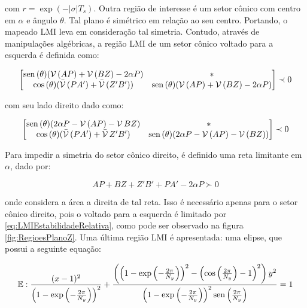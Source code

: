 \noindent com $r = \exp{\left(-|\sigma|T_s\right)}$. Outra região de interesse é um setor cônico com centro em $\alpha$ e ângulo $\theta$. Tal plano é simétrico em relação ao seu centro. Portando, o mapeado LMI leva em consideração tal simetria. Contudo, através de manipulações algébricas, a região LMI de um setor cônico voltado para a esquerda é definida como:

\begin{equation}
  \begin{bmatrix*}[c]
    \sen{(\theta)(\Herm{(AP)} + \Herm{(BZ)} -2\alpha P)} &  * \\
    \cos{(\theta)(\herm{(PA')} + \herm{(Z'B')})}      &  \sen{(\theta)(\Herm{(AP)} + \Herm{(BZ)} -2\alpha P)}
  \end{bmatrix*}
  \prec 0\label{eq:LMIESetorConicoEsquerdo}
\end{equation}

\noindent com seu lado direito dado como:

\begin{equation}
  \begin{bmatrix*}[c]
    \sen{(\theta)(2\alpha P - \Herm{(AP)} - \Herm{BZ})} & * \\
    \cos{(\theta)(\herm{(PA')} + \herm{Z'B'})}       & \sen{(\theta)(2\alpha P - \Herm{(AP)} - \Herm{(BZ)})}
  \end{bmatrix*}
  \prec 0\label{eq:LMIESetorConicoDireito}
\end{equation}

Para impedir a simetria do setor cônico direito, é definido uma reta limitante em $\alpha$, dado por:

\begin{equation}
  AP + BZ + Z'B' + PA' -2\alpha P\label{eq:LMIRightBounded} \succ 0
\end{equation}

\noindent onde considera a área a direita de tal reta. Isso é necessário apenas para o setor cônico direito, pois o voltado para a  esquerda é limitado por \eqref{eq:LMIEstabilidadeRelativa}, como pode ser observado na figura \ref{fig:RegioesPlanoZ}. Uma última região LMI é apresentada: uma elipse, que possui a seguinte equação\cite{CHIQUETO2021}:

\begin{equation}
  \mathbb{E}: \dfrac{(x-1)^2}{\left(1-\exp{\left(-\frac{2\pi}{N_y}\right)}\right)^2} + \dfrac{\left(\left(1-\exp{\left(-\frac{2\pi}{N_y}\right)}\right)^2 - \left(\cos{\left(\frac{2\pi}{N_y}\right)} - 1\right)^2\right)y^2}{\left(1-\exp{\left(-\frac{2\pi}{N_y}\right)}\right)^2\operatorname{sen}{\left(\frac{2\pi}{N_y}\right)}} = 1\label{eq:Elipse}
\end{equation}

